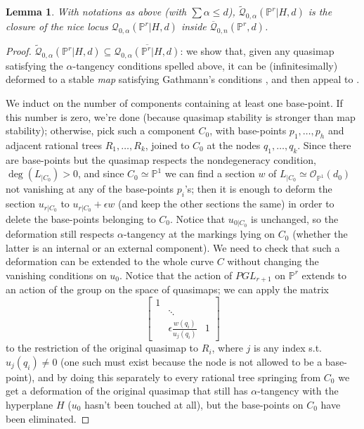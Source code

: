 \documentclass[11pt]{amsart}
\newcommand{\Q}[4]{\overline{\mathcal Q}_{#1,#2}(#3,#4)}
\newcommand{\Qt}[4]{\widetilde{\mathcal Q}_{#1,#2}(#3,#4)}
\newcommand{\PP}{\mathbb P}
\theoremstyle{plain}
\newtheorem{lem}[thm]{Lemma}
\theoremstyle{definition}
\begin{document}
\begin{lem}
With notations as above (with $\sum\alpha\leq d$), $\Qt{0}{\alpha}{\PP^r|H}{d}$ is the closure of the nice locus $\mathcal Q_{0,\alpha}(\PP^r|H,d)$ inside $\Q{0}{n}{\PP^r}{d}$. 
\end{lem}
\begin{proof}
$\Qt{0}{\alpha}{\PP^r|H}{d}\subseteq\overline{\mathcal Q_{0,\alpha}(\PP^r|H,d)}$: we show that, given any quasimap satisfying the $\alpha$-tangency conditions spelled above, it can be (infinitesimally) deformed to a stable \emph{map} satisfying Gathmann's conditions \cite[Def. 1.1 and Rmk. 1.4]{Ga}, and then appeal to \cite[Prop. 1.14]{Ga}.

We induct on the number of components containing at least one base-point. If this number is zero, we're done (because quasimap stability is stronger than map stability); otherwise, pick such a component $C_0$, with base-points $p_1,\ldots,p_h$ and adjacent rational trees $R_1,\ldots,R_k$, joined to $C_0$ at the nodes $q_1,\ldots,q_k$. Since there are base-points but the quasimap respects the nondegeneracy condition, $\deg(L_{|C_0})>0$, and since $C_0\simeq\PP^1$ we can find a section $w$ of $L_{|C_0}\simeq\mathcal O_{\PP^1}(d_0)$ not vanishing at any of the base-points $p_i$'s; then it is enough to deform the section $u_{r|C_0}$ to $u_{r|C_0}+\epsilon w$ (and keep the other sections the same) in order to delete the base-points belonging to $C_0$. Notice that $u_{0|C_0}$ is unchanged, so the deformation still respects $\alpha$-tangency at the markings lying on $C_0$ (whether the latter is an internal or an external component). We need to check that such a deformation can be extended to the whole curve $C$ without changing the vanishing conditions on $u_0$. Notice that the action of $PGL_{r+1}$ on $\PP^r$ extends to an action of the group on the space of quasimaps; we can apply the matrix
\[
\begin{bmatrix}
1 & & \\
 & \ddots & \\
 & \epsilon \frac{w(q_i)}{u_j(q_i)} & 1
\end{bmatrix}
\]
to the restriction of the original quasimap to $R_i$, where $j$ is any index s.t. $u_j(q_i)\neq 0$ (one such must exist because the node is not allowed to be a base-point), and by doing this separately to every rational tree springing from $C_0$ we get a deformation of the original quasimap that still has $\alpha$-tangency with the hyperplane $H$ ($u_0$ hasn't been touched at all), but the base-points on $C_0$ have been eliminated.


\end{proof}
\end{document}

